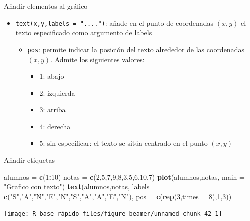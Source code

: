 \documentclass[
  ignorenonframetext,
  aspectratio=169]{beamer}
\newenvironment{Shaded}{\begin{snugshade}}{\end{snugshade}}
\newcommand{\AttributeTok}[1]{\textcolor[rgb]{0.13,0.29,0.53}{#1}}
\newcommand{\DecValTok}[1]{\textcolor[rgb]{0.00,0.00,0.81}{#1}}
\newcommand{\FunctionTok}[1]{\textcolor[rgb]{0.13,0.29,0.53}{\textbf{#1}}}
\newcommand{\NormalTok}[1]{#1}
\newcommand{\OtherTok}[1]{\textcolor[rgb]{0.56,0.35,0.01}{#1}}
\newcommand{\SpecialCharTok}[1]{\textcolor[rgb]{0.81,0.36,0.00}{\textbf{#1}}}
\newcommand{\StringTok}[1]{\textcolor[rgb]{0.31,0.60,0.02}{#1}}
\providecommand{\tightlist}{%
  \setlength{\itemsep}{0pt}\setlength{\parskip}{0pt}}
\begin{document}
\begin{frame}[fragile]{Añadir elementos al gráfico}
\label{auxf1adir-elementos-al-gruxe1fico-1}
\begin{itemize}
\tightlist
\item
  \texttt{text(x,y,labels\ =\ "....")}: añade en el punto de coordenadas
  \((x,y)\) el texto especificado como argumento de labels

  \begin{itemize}
  \tightlist
  \item
    \texttt{pos}: permite indicar la posición del texto alrededor de las
    coordenadas \((x,y)\). Admite los siguientes valores:

    \begin{itemize}
    \tightlist
    \item
      1: abajo
    \item
      2: izquierda
    \item
      3: arriba
    \item
      4: derecha
    \item
      5: sin especificar: el texto se sitúa centrado en el punto
      \((x,y)\)
    \end{itemize}
  \end{itemize}
\end{itemize}
\end{frame}

\begin{frame}[fragile]{Añadir etiquetas}
\label{auxf1adir-etiquetas}
\begin{Shaded}
\begin{Highlighting}[]
\NormalTok{alumnos }\OtherTok{=} \FunctionTok{c}\NormalTok{(}\DecValTok{1}\SpecialCharTok{:}\DecValTok{10}\NormalTok{)}
\NormalTok{notas }\OtherTok{=} \FunctionTok{c}\NormalTok{(}\DecValTok{2}\NormalTok{,}\DecValTok{5}\NormalTok{,}\DecValTok{7}\NormalTok{,}\DecValTok{9}\NormalTok{,}\DecValTok{8}\NormalTok{,}\DecValTok{3}\NormalTok{,}\DecValTok{5}\NormalTok{,}\DecValTok{6}\NormalTok{,}\DecValTok{10}\NormalTok{,}\DecValTok{7}\NormalTok{)}
\FunctionTok{plot}\NormalTok{(alumnos,notas, }\AttributeTok{main =} \StringTok{"Grafico con texto"}\NormalTok{)}
\FunctionTok{text}\NormalTok{(alumnos,notas, }
     \AttributeTok{labels =} \FunctionTok{c}\NormalTok{(}\StringTok{"S"}\NormalTok{,}\StringTok{"A"}\NormalTok{,}\StringTok{"N"}\NormalTok{,}\StringTok{"E"}\NormalTok{,}\StringTok{"N"}\NormalTok{,}\StringTok{"S"}\NormalTok{,}\StringTok{"A"}\NormalTok{,}\StringTok{"A"}\NormalTok{,}\StringTok{"E"}\NormalTok{,}\StringTok{"N"}\NormalTok{), }
     \AttributeTok{pos =} \FunctionTok{c}\NormalTok{(}\FunctionTok{rep}\NormalTok{(}\DecValTok{3}\NormalTok{,}\AttributeTok{times =} \DecValTok{8}\NormalTok{),}\DecValTok{1}\NormalTok{,}\DecValTok{3}\NormalTok{))}
\end{Highlighting}
\end{Shaded}

\begin{center}\texttt{[image: R\_base\_rápido\_files/figure-beamer/unnamed-chunk-42-1]} \end{center}
\end{frame}
\end{document}
